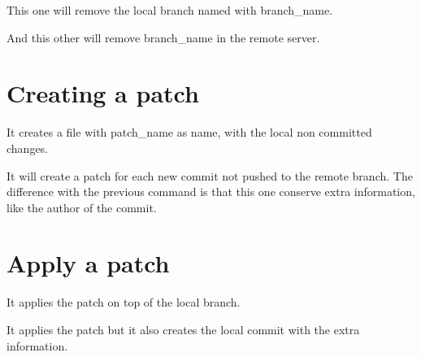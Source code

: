 \noindent{}

This one will remove the local branch named with branch\_name.

\noindent{}

And this other will remove branch\_name in the remote server.

\section*{Creating a patch}

\noindent{}

It creates a file with patch\_name as name, with the local non committed changes.

\noindent{}

It will create a patch for each new commit not pushed to the remote branch. The difference with the previous command is that this one conserve extra information, like the author of the commit.

\newpage
\section*{Apply a patch}

\noindent{}

It applies the patch on top of the local branch.

\noindent{}

It applies the patch but it also creates the local commit with the extra information.
